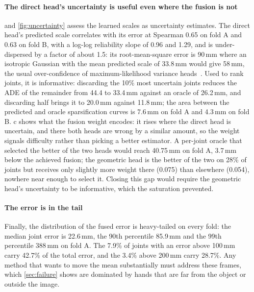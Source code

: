 \paragraph{The direct head's uncertainty is useful even where the fusion is not}
 and \cref{fig:uncertainty} assess the learned scales as uncertainty estimates. The direct head's predicted scale correlates with its error at Spearman 0.65 on fold A and 0.63 on fold B, with a log-log reliability slope of 0.96 and 1.29, and is under-dispersed by a factor of about 1.5: its root-mean-square error is 90\,mm where an isotropic Gaussian with the mean predicted scale of 33.8\,mm would give 58\,mm, the usual over-confidence of maximum-likelihood variance heads~\cite{guo2017calibration}. Used to rank joints, it is informative: discarding the 10\% most uncertain joints reduces the ADE of the remainder from 44.4 to 33.4\,mm against an oracle of 26.2\,mm, and discarding half brings it to 20.0\,mm against 11.8\,mm; the area between the predicted and oracle sparsification curves is 7.6\,mm on fold A and 4.3\,mm on fold B. c shows what the fusion weight encodes: it rises where the direct head is uncertain, and there both heads are wrong by a similar amount, so the weight signals difficulty rather than picking a better estimator. A per-joint oracle that selected the better of the two heads would reach 40.75\,mm on fold A, 3.7\,mm below the achieved fusion; the geometric head is the better of the two on 28\% of joints but receives only slightly more weight there (0.075) than elsewhere (0.054), nowhere near enough to select it. Closing this gap would require the geometric head's uncertainty to be informative, which the saturation prevented.

\paragraph{The error is in the tail}
Finally, the distribution of the fused error is heavy-tailed on every fold: the median joint error is 22.6\,mm, the 90th percentile 85.9\,mm and the 99th percentile 388\,mm on fold A. The 7.9\% of joints with an error above 100\,mm carry 42.7\% of the total error, and the 3.4\% above 200\,mm carry 28.7\%. Any method that wants to move the mean substantially must address these frames, which \cref{sec:failure} shows are dominated by hands that are far from the object or outside the image.
